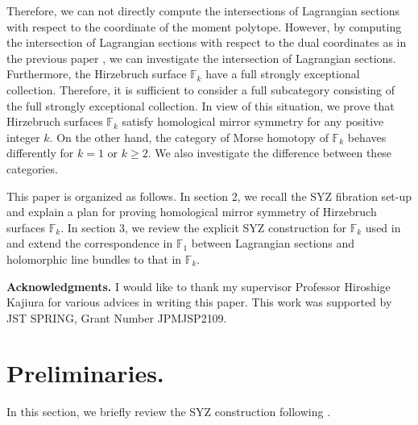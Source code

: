 \documentclass[12pt,reqno]{amsart}
\newcommand{\F}{{\mathbb{F}}}
\newcommand{\Fk}{{\F_k}}
\theoremstyle{definition}
\begin{document}
 Therefore, we can not directly compute the intersections of Lagrangian sections with respect to the coordinate of the moment polytope. 
 However, by computing the intersection of Lagrangian sections with respect to the dual coordinates as in the previous paper \cite{HN}, we can investigate the intersection of Lagrangian sections. Furthermore, the Hirzebruch surface $\Fk$ have a full strongly exceptional collection. Therefore, it is sufficient to consider a full subcategory consisting of the full strongly exceptional collection.
 In view of this situation, we prove that Hirzebruch surfaces $\Fk$ satisfy homological mirror symmetry for any positive integer $k$. On the other hand, the category of Morse homotopy of $\Fk$ behaves differently for $k=1$ or $k\geq2$. We also investigate the difference between these categories.\par
This paper is organized as follows. In section 2, we recall the SYZ fibration set-up and explain a plan for proving homological mirror symmetry of Hirzebruch surfaces $\Fk$. In section 3, we review the explicit SYZ construction for $\Fk$ used in \cite{fut-kaj2} and extend the correspondence in $\F_1$ between Lagrangian sections and holomorphic line bundles to that in $\Fk$. 
\par
\noindent
{\bf Acknowledgments.}
I would like to thank my supervisor Professor Hiroshige Kajiura for various advices in writing this paper.
This work was supported by JST SPRING, Grant Number JPMJSP2109.

\section{Preliminaries.}
In this section, we briefly review the SYZ construction following \cite{LYZ,leung05,fut-kaj1,fut-kaj2,HN}.
\end{document}
